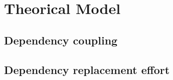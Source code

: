 \chapter{Theorical Model}\label{ch:TheoricModel}

\section{Dependency coupling}

\section{Dependency replacement effort}
\begin{comment}
\subsection{Defining the taxonomy of package replacement (\textbf{RQ2.2})}

Before starting the measurement of package replacement, it is important to specify which kind of replacement is being studied. Therefore, we have defined a classification of the possible scenarios.

First, Kula et al. \cite{kula2014visualizing} in their study about the visualization of the evolution of library dependency, identify four distinct behabiours. Namely, adopter, idler, updater and dropper. In addition, Kikas et al. \cite{kikas2017structure} when studying the evolution of software ecosystems, define two different types of update, explicit and implicit. Considering this two classifications, we have created the following classification:

\begin{table}[ht!]
    \begin{center}
    \begin{tabularx}{\textwidth}{|X|l|l|}
      \hline
      Description & Kula et al. & Kikas et al. \\
      \hline\hline
      Add new package dependency & adopter & - \\
      \hline
      Maintain package dependency in new application version & idler & - \\
      \hline
      Manual update of dependent package version & updater & explicit package update \\
      \hline
      Automatic update of dependent package version & updater & implicit package update \\
      \hline
      Change a dependency from one package to another & dropper \& adopter & - \\
      \hline
      Remove dependency with a package & dropper & - \\
      \hline
    \end{tabularx}
    \end{center}
    \caption{Taxonomy of depdendency evolution}
    \label{table:taxonomy-dependency}
\end{table}


\end{comment}
